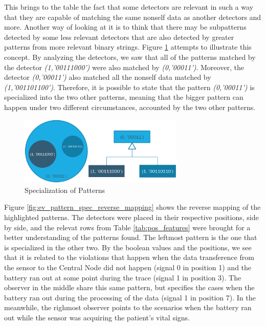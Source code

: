 This brings to the table the fact that some detectors are relevant in such a way that they are capable of matching the same nonself data as another detectors and more. Another way of looking at it is to think that there may be subpatterns detected by some less relevant detectors that are also detected by greater patterns from more relevant binary strings. Figure \ref{fig:ev_pattern_spec} attempts to illustrate this concept. By analyzing the detectors, we saw that all of the patterns matched by the detector \textit{(1,'00111000')} were also matched by \textit{(0,'00011')}. Moreover, the detector \textit{(0,'00011')} also matched all the nonself data matched by \textit{(1,'001101100')}. Therefore, it is possible to state that the pattern \textit{(0,'00011')} is specialized into the two other patterns, meaning that the bigger pattern can happen under two different circumstances, accounted by the two other patterns.

\begin{figure}[]
	\centering
	\includegraphics[width=0.7\textwidth, keepaspectratio]{img/pattern_specialization.png}
	\caption{Specialization of Patterns}
	\label{fig:ev_pattern_spec}
\end{figure}

Figure \ref{fig:ev_pattern_spec_reverse_mapping} shows the reverse mapping of the highlighted patterns. The detectors were placed in their respective positions, side by side, and the relevat rows from Table \ref{tab:pos_features} were brought for a better understanding of the patterns found. The leftmost pattern is the one that is specialized in the other two. By the boolean values and the positions, we see that it is related to the violations that happen when the data transference from the sensor to the Central Node did not happen (signal 0 in position 1) and the battery ran out at some point during the trace (signal 1 in position 3). The observer in the middle share this same pattern, but specifies the cases when the battery ran out during the processing of the data (signal 1 in position 7). In the meanwhile, the righmost observer points to the scenarios when the battery ran out while the sensor was acquiring the patient's vital signs.


